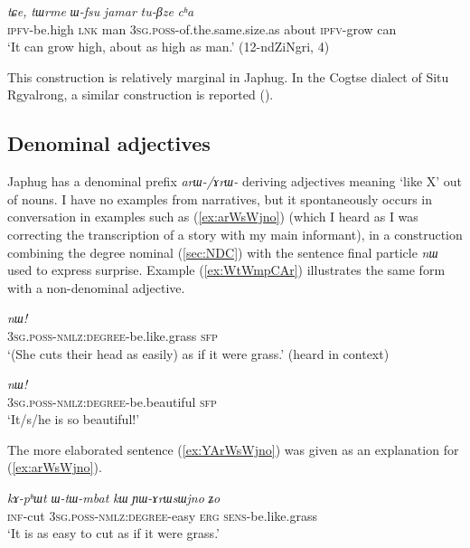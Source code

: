 \documentclass[oneside,a4paper,11pt]{article}
\newcommand{\ipa}[1]{{\phon\textit{#1}}}
\begin{document}
\begin{exe}
\ex \label{ex:Wfsu}
\gll \ipa{tu-mbro} 	\ipa{tɕe,} 	\ipa{tɯrme} 	\ipa{ɯ-fsu} 	\ipa{jamar} 	\ipa{tu-βze} 	\ipa{cʰa} \\
\textsc{ipfv}-be.high \textsc{lnk} man \textsc{3sg.poss}-of.the.same.size.as about \textsc{ipfv}-grow can \\
\glt `It can grow high, about as high as man.' (12-ndZiNgri, 4)
\end{exe}

This construction is relatively marginal in Japhug. In the Cogtse dialect of Situ Rgyalrong, a similar construction is reported (\citealt[377]{linxr93jiarong}).

\subsection{Denominal adjectives} \label{sec:denominal}
Japhug has a denominal prefix \ipa{arɯ-/ɤrɯ-} deriving adjectives meaning `like X' out of nouns. I have no examples from narratives, but it spontaneously occurs in conversation  in examples such as (\ref{ex:arWsWjno}) (which I heard as I was correcting the transcription of a story with my main informant), in a construction combining the degree nominal (\ref{sec:NDC}) with the sentence final particle \ipa{nɯ} used to express surprise. Example (\ref{ex:WtWmpCAr}) illustrates the same form with a non-denominal adjective.

\begin{exe}
\ex \label{ex:arWsWjno}
\gll \ipa{ɯ-tɯ-ɤrɯsɯjno} 	\ipa{nɯ!}  \\
\textsc{3sg.poss-nmlz:degree}-be.like.grass \textsc{sfp} \\
\glt `(She cuts their head as easily) as if it were grass.' (heard in context)
\end{exe}

\begin{exe}
\ex \label{ex:WtWmpCAr}
\gll \ipa{ɯ-tɯ-mpɕɤr} 	\ipa{nɯ!}  \\
\textsc{3sg.poss-nmlz:degree}-be.beautiful \textsc{sfp} \\
\glt `It/s/he is so beautiful!'
\end{exe}

The more elaborated sentence (\ref{ex:YArWsWjno}) was given as an explanation for (\ref{ex:arWsWjno}).

\begin{exe}
\ex \label{ex:YArWsWjno}
\gll  
\ipa{kɤ-pʰɯt} 	\ipa{ɯ-tɯ-mbat} 	\ipa{kɯ} 	\ipa{ɲɯ-ɤrɯsɯjno} 	\ipa{ʑo} \\
\textsc{inf}-cut  \textsc{3sg.poss-nmlz:degree}-easy \textsc{erg} \textsc{sens}-be.like.grass \\
\glt `It is as easy to cut as if it were grass.' 
\end{exe}
\end{document}
